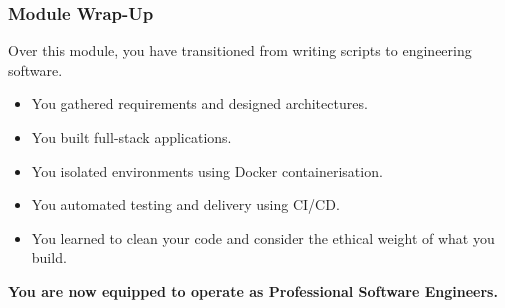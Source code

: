 \documentclass[xcolor=table]{beamer}
\begin{document}
\begin{frame}
    \frametitle{Module Wrap-Up}
    \small
    Over this module, you have transitioned from writing scripts to engineering software.
    
    \begin{itemize}
        \item You gathered requirements and designed architectures.
        \item You built full-stack applications.
        \item You isolated environments using Docker containerisation.
        \item You automated testing and delivery using CI/CD.
        \item You learned to clean your code and consider the ethical weight of what you build.
    \end{itemize}
    
    \vspace{0.3cm}
    \begin{center}
        \textbf{You are now equipped to operate as Professional Software Engineers.}
    \end{center}
\end{frame}
\end{document}

